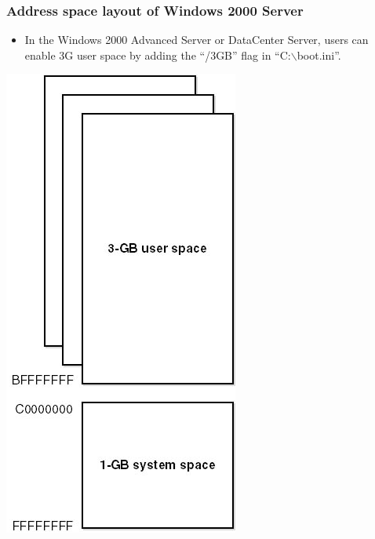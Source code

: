 \documentclass[CJKutf8,xcolor=pdftex,dvipsnames,table]{beamer}
\begin{document}
\begin{CJK*}{UTF8}{song}
  \begin{frame}
    \frametitle{Address space layout of Windows 2000 Server} \pause
    \begin{minipage}[c]{0.6\textwidth}
      \begin{itemize}
      \item{In the Windows 2000 Advanced Server or DataCenter Server, users can enable 3G user space by adding the ``/3GB'' flag in ``C:$\backslash$boot.ini''.} \pause
      \end{itemize}
    \end{minipage}%
    \begin{minipage}[c]{0.4\textwidth}
      \centering
      \includegraphics[scale=0.3]{2kslayout}
    \end{minipage}
  \end{frame}

\fi
  

\end{CJK*}
\end{document}
